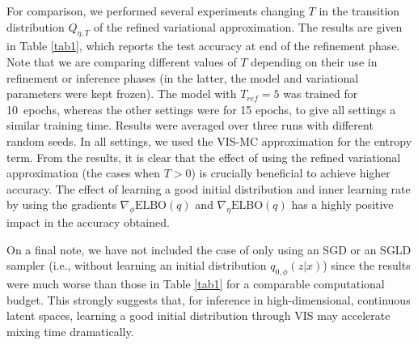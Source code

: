 For comparison, we performed several experiments changing $T$ in 
the transition distribution $Q_{\eta, T}$ of 
the refined variational approximation. %
The results are given in Table \ref{tab1}, which reports
the test accuracy at 
end of {the refinement phase}. Note that we are comparing different values of $T$ depending on their use in {refinement or inference} phases (in the latter, the model and variational parameters were kept frozen). The model with $T_{ref} = 5$ was trained for 10~epochs, whereas the other settings were for 15 epochs, to give all settings a similar training time.  Results were averaged over three runs with different random seeds. In all settings, we used the VIS-MC approximation for the entropy term. From the results, it is clear that the effect of using the refined variational approximation (the cases when $T > 0$) is crucially beneficial to achieve higher accuracy. The effect of learning a good initial distribution and inner learning rate by using the gradients $\nabla_{\phi} \mbox{ELBO}(q)$ and $\nabla_{\eta} \mbox{ELBO}(q)$ has a highly positive impact in the accuracy obtained.

On a final note, we have not included the case of only using an SGD or an SGLD sampler (i.e., without learning an initial distribution $q_{0, \phi} (z|x)$) since the results were much worse than those in Table \ref{tab1} for a comparable computational budget. This strongly suggests that, for inference in high-dimensional, continuous latent spaces, learning a good initial distribution through VIS may accelerate mixing time
dramatically.

